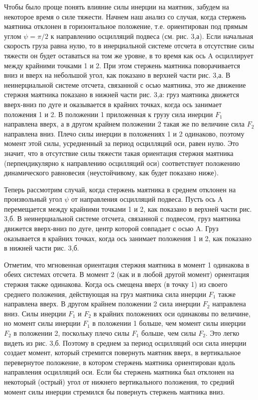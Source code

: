 \documentclass[a4paper,12pt]{article} %
\begin{document}
Чтобы было проще понять влияние силы инерции на маятник, забудем на некоторое время о силе тяжести. Начнем наш анализ со случая, когда стержень маятника отклонен в горизонтальное положение, т.е. ориентирован под прямым углом $\psi = \pi/2$ к направлению осцилляций подвеса (см. рис. 3,а). Если начальная скорость груза равна нулю, то в инерциальной системе отсчета в отсутствие силы тяжести он будет оставаться на том же уровне, в то время как ось A осциллирует между крайними точками 1 и 2. При этом стержень маятника поворачивается вниз и вверх на небольшой угол, как показано в верхней части рис. 3,а. В неинерциальной системе отсчета, связанной с осью маятника, это же движение стержня маятника показано в нижней части рис. 3,а: груз маятника движется вверх-вниз по дуге и оказывается в крайних точках, когда ось занимает положения 1 и 2. В положении 1 приложенная к грузу сила инерции $F_1$ направлена вверх, а в другом крайнем положении 2 такая же по величине сила $F_2$ направлена вниз. Плечо силы инерции в положениях 1 и 2 одинаково, поэтому момент этой силы, усредненный за период осцилляций оси, равен нулю. Это значит, что в отсутствие силы тяжести такая ориентация стержня маятника (перпендикулярно к направлению осцилляций оси) соответствует положению динамического равновесия (неустойчивому, как будет показано ниже).

Теперь рассмотрим случай, когда стержень маятника в среднем отклонен на произвольный угол $\psi$ от направления осцилляций подвеса. Пусть ось A перемещается между крайними точками 1 и 2, как показано в верхней части рис. 3,б. В неинерциальной системе отсчета, связанной с подвесом, груз маятника движется вверх-вниз по дуге, центр которой совпадает с осью A. Груз оказывается в крайних точках, когда ось занимает положения 1 и 2, как показано в нижней части рис. 3,б.

Отметим, что мгновенная ориентация стержня маятника в момент 1 одинакова в обеих системах отсчета. В момент 2 (как и в любой другой момент) ориентация стержня также одинакова. Когда ось смещена вверх (в точку 1) из своего среднего положения, действующая на груз маятника сила инерции $F_1$ также направлена вверх. В другом крайнем положении 2 сила инерции $F_2$ направлена вниз. Силы инерции $F_1$ и $F_2$ в крайних положениях оси одинаковы по величине, но момент силы инерции $F_1 $ в положении 1 больше, чем момент силы инерции $F_2$ в положении 2, поскольку плечо силы $F_1$ больше, чем силы $F_2$. Это легко видеть из рис. 3,б. Поэтому в среднем за период осцилляций оси сила инерции создает момент, который стремится повернуть маятник вверх, в вертикальное перевернутое положение, в котором стержень маятника ориентирован вдоль направления осцилляций оси. Если бы стержень маятника был отклонен на некоторый (острый) угол от нижнего вертикального положения, то средний момент силы инерции стремился бы повернуть стержень маятника вниз.
\end{document}
